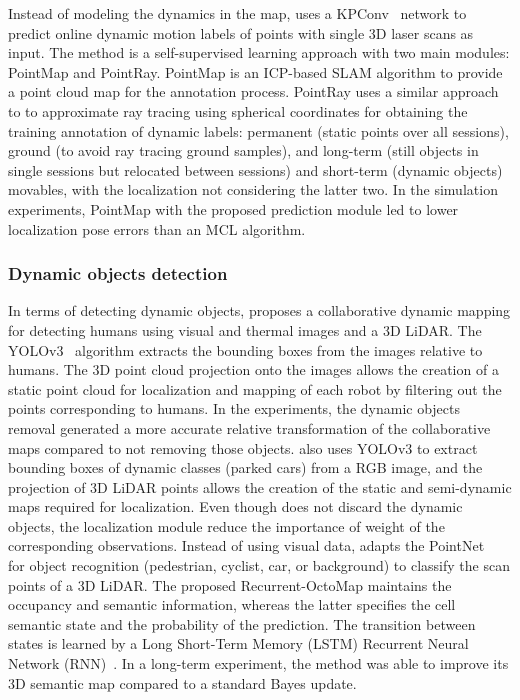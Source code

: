 Instead of modeling the dynamics in the map, \cite{thomas-et-al:2021:9561701} uses a KPConv~\parencite{original:kpconv} network to predict online dynamic motion labels of points with single 3D laser scans as input. The method is a self-supervised learning approach with two main modules: PointMap and PointRay. PointMap is an ICP-based SLAM algorithm to provide a point cloud map for the annotation process. PointRay uses a similar approach to \cite{pomerleau-et-al:2014:6907397} to approximate ray tracing using spherical coordinates for obtaining the training annotation of dynamic labels: permanent (static points over all sessions), ground (to avoid ray tracing ground samples), and long-term (still objects in single sessions but relocated between sessions) and short-term (dynamic objects) movables, with the localization not considering the latter two. In the simulation experiments, PointMap with the proposed prediction module led to lower localization pose errors than an MCL algorithm.



\subsubsection{Dynamic objects detection}

In terms of detecting dynamic objects, \cite{yue-et-al:2020:9197072} proposes a collaborative dynamic mapping for detecting humans using visual and thermal images and a 3D LiDAR. The YOLOv3~\parencite{original:yolov3} algorithm extracts the bounding boxes from the images relative to humans. The 3D point cloud projection onto the images allows the creation of a static point cloud for localization and mapping of each robot by filtering out the points corresponding to humans. In the experiments, the dynamic objects removal generated a more accurate relative transformation of the collaborative maps compared to not removing those objects.
\cite{zhu-et-al:2021:9561584} also uses YOLOv3 to extract bounding boxes of dynamic classes (parked cars) from a RGB image, and the projection of 3D LiDAR points allows the creation of the static and semi-dynamic maps required for localization. Even though \cite{zhu-et-al:2021:9561584} does not discard the dynamic objects, the localization module reduce the importance of weight of the corresponding observations.
Instead of using visual data, \cite{sun-et-al:2018:2856268} adapts the PointNet~\parencite{original:pointnet} for object recognition (pedestrian, cyclist, car, or background) to classify the scan points of a 3D LiDAR. The proposed Recurrent-OctoMap maintains the occupancy and semantic information, whereas the latter specifies the cell semantic state and the probability of the prediction. The transition between states is learned by a Long Short-Term Memory (LSTM) Recurrent Neural Network (RNN)~\parencite{original:lstm-rnn}. In a long-term experiment, the method was able to improve its 3D semantic map compared to a standard Bayes update.

